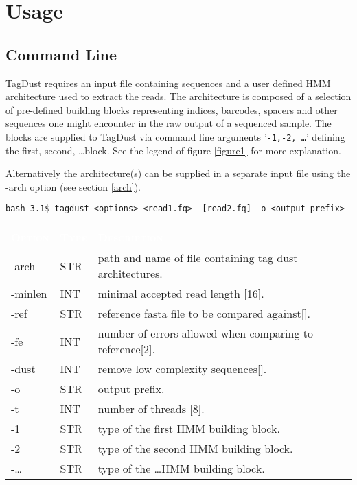 \documentclass[11pt,a4paper,oneside]{book}
\begin{document}
\chapter{Usage}

\section{Command Line}
TagDust requires an input file containing sequences and a user defined HMM architecture used to extract the reads. The architecture is composed of a selection of pre-defined building blocks representing indices, barcodes, spacers and other sequences one might encounter in the raw output of a sequenced sample. The blocks are supplied to TagDust via command line arguments  '{\tt -1,-2, \dots }' defining the first, second, \dots block. See the legend of figure \ref{figure1} for more explanation. 

Alternatively the architecture(s) can be supplied in a separate input file using the -arch option (see section \ref{arch}).  

\begin{verbatim}
bash-3.1$ tagdust <options> <read1.fq>  [read2.fq] -o <output prefix> 
\end{verbatim}


\begin{center}
\begin{tabular}{| l | l | p{12cm}|}
\hline
\rowcolor{blue} \textcolor{white}{\scshape Option}		&\textcolor{white}{\scshape Type}		&	\textcolor{white}{\scshape Description}\\ \hline
-arch & STR & path and name of file containing tag dust architectures. \\
-minlen & INT & minimal accepted read length [16].\\
-ref     &  STR &    reference fasta file to be compared against[].\\
-fe &       INT &    number of errors allowed when comparing to reference[2].\\
-dust &	INT &	remove low complexity sequences[].\\
-o & STR & output prefix.\\
-t & INT & number of threads [8].\\
-1 & STR & type of the first HMM building block. \\
-2 & STR & type of the second HMM building block.\\
-\dots & STR & type of the \dots HMM building block.\\
\hline
\end{tabular}
\end{center}
\end{document}
